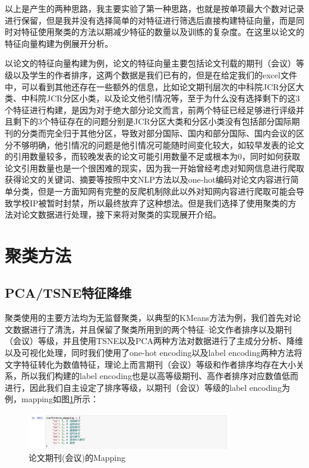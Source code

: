 以上是产生的两种思路，我主要实验了第一种思路，也就是按单项最大个数对记录进行保留，但是我并没有选择简单的对特征进行筛选后直接构建特征向量，而是同时对特征使用聚类的方法以期减少特征的数量以及训练的复杂度。在这里以论文的特征向量构建为例展开分析。

以论文的特征向量构建为例，论文的特征向量主要包括论文刊载的期刊（会议）等级以及学生的作者排序，这两个数据是我们已有的，但是在给定我们的excel文件中，可以看到其他还存在一些额外的信息，比如论文期刊层次的中科院JCR分区大类、中科院JCR分区小类，以及论文他引情况等，至于为什么没有选择剩下的这3个特征进行构建，是因为对于绝大部分论文而言，前两个特征已经足够进行评级并且剩下的3个特征存在的问题分别是JCR分区大类和分区小类没有包括部分国际期刊的分类而完全归于其他分区，导致对部分国际、国内和部分国际、国内会议的区分不够明确，他引情况的问题是他引情况可能随时间变化较大，如较早发表的论文的引用数量较多，而较晚发表的论文可能引用数量不足或根本为0，同时如何获取论文引用数量也是一个很困难的现实，因为我一开始曾经考虑对知网信息进行爬取获得论文的关键词、摘要等按照中文NLP方法以及one-hot编码对论文内容进行简单分类，但是一方面知网有完整的反爬机制除此以外对知网内容进行爬取可能会导致学校IP被暂时封禁，所以最终放弃了这种想法。但是我们选择了使用聚类的方法对论文数据进行处理，接下来将对聚类的实现展开介绍。 

\section{聚类方法}

\subsection{PCA/TSNE特征降维}

聚类使用的主要方法均为无监督聚类，以典型的KMeans方法为例，我们首先对论文数据进行了清洗，并且保留了聚类所用到的两个特征--论文作者排序以及期刊（会议）等级，并且使用TSNE以及PCA两种方法对数据进行了主成分分析、降维以及可视化处理，同时我们使用了one-hot encoding以及label encoding两种方法将文字特征转化为数值特征，理论上而言期刊（会议）等级和作者排序均存在大小关系，所以我们构建的label encoding也是以高等级期刊、高作者排序对应数值低而进行，因此我们自主设定了排序等级，以期刊（会议）等级的label encoding为例，mapping如图\ref{paper-conference-label-encoding}所示：
\begin{figure}[htb]
    \vspace{6pt} %
    \centering
    \includegraphics[width=0.8\textwidth]{images/Paper-conference-mapping.png}
    \caption{论文期刊(会议)的Mapping}\label{paper-conference-label-encoding} %
\end{figure}


